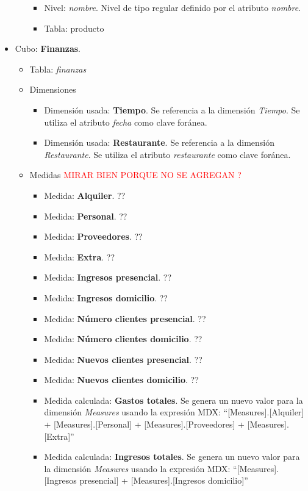 \documentclass[11pt]{opticajnl}
\begin{document}
\begin{itemize}
\begin{itemize}
\begin{itemize}
\item Nivel: \textit{nombre}. Nivel de tipo regular definido por el atributo \textit{nombre}.
\item Tabla: producto
\end{itemize}
\end{itemize}
\item Cubo: \textbf{Finanzas}. 
\begin{itemize}
\item Tabla: \textit{finanzas}
\item Dimensiones 
\begin{itemize}
\item Dimensión usada: \textbf{Tiempo}. Se referencia a la dimensión \textit{Tiempo}. Se utiliza el atributo \textit{fecha} como clave foránea.
\item Dimensión usada: \textbf{Restaurante}. Se referencia a la dimensión \textit{Restaurante}. Se utiliza el atributo \textit{restaurante} como clave foránea.
\end{itemize}
\item Medidas \textcolor{red}{MIRAR BIEN PORQUE NO SE AGREGAN ?}
\begin{itemize}
\item Medida: \textbf{Alquiler}. ??
\item Medida: \textbf{Personal}. ??
\item Medida: \textbf{Proveedores}. ??
\item Medida: \textbf{Extra}. ??
\item Medida: \textbf{Ingresos presencial}. ??
\item Medida: \textbf{Ingresos domicilio}. ??
\item Medida: \textbf{Número clientes presencial}. ??
\item Medida: \textbf{Número clientes domicilio}. ??
\item Medida: \textbf{Nuevos clientes presencial}. ??
\item Medida: \textbf{Nuevos clientes domicilio}. ??
\item Medida calculada: \textbf{Gastos totales}. Se genera un nuevo valor para la dimensión \textit{Measures} usando la expresión MDX: ``[Measures].[Alquiler] + [Measures].[Personal] + [Measures].[Proveedores] + [Measures].[Extra]''
\item Medida calculada: \textbf{Ingresos totales}. Se genera un nuevo valor para la dimensión \textit{Measures} usando la expresión MDX: ``[Measures].[Ingresos presencial] + [Measures].[Ingresos domicilio]''

\end{itemize}
\end{itemize}
\end{itemize}
\end{document}
